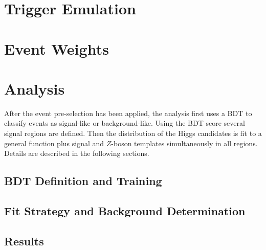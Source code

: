 \documentclass[UKenglish,texlive=2013]{\ATLASLATEXPATH atlasdoc}
\begin{document}
\section{Trigger Emulation}
\label{sec:trig}



\section{Event Weights}
\label{sec:weights}


\section{Analysis}
\label{sec:analysis}
After the event pre-selection has been applied, the analysis first uses a BDT to classify events as signal-like or background-like. Using the BDT score several signal regions are defined.  Then the \Mbb distribution of the Higgs candidates is fit to a general function plus signal and $Z$-boson templates simultaneously in all regions. Details are described in the following sections.  

\subsection{BDT Definition and Training}
\label{sec:bdt}


\clearpage

\subsection{Fit  Strategy and Background Determination}
\label{sec:fitbkgds}

%
%
\subsection{Results}
\label{sec:result}

\end{document}
